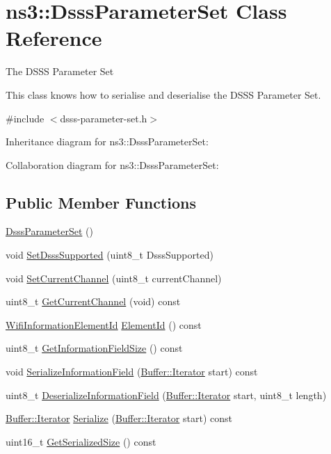 \hypertarget{classns3_1_1DsssParameterSet}{}\section{ns3\+:\+:Dsss\+Parameter\+Set Class Reference}
\label{classns3_1_1DsssParameterSet}


The D\+S\+SS Parameter Set

This class knows how to serialise and deserialise the D\+S\+SS Parameter Set.  




{\ttfamily \#include $<$dsss-\/parameter-\/set.\+h$>$}



Inheritance diagram for ns3\+:\+:Dsss\+Parameter\+Set\+:


Collaboration diagram for ns3\+:\+:Dsss\+Parameter\+Set\+:
\subsection*{Public Member Functions}
\begin{DoxyCompactItemize}
\item 
\hyperlink{classns3_1_1DsssParameterSet_a5b6ac7920637037ab3df38de9e98a553}{Dsss\+Parameter\+Set} ()
\item 
void \hyperlink{classns3_1_1DsssParameterSet_aface43655b0b568581d507b04dace538}{Set\+Dsss\+Supported} (uint8\+\_\+t Dsss\+Supported)
\item 
void \hyperlink{classns3_1_1DsssParameterSet_a52e56c7e20f9a889197920060d3b7a01}{Set\+Current\+Channel} (uint8\+\_\+t current\+Channel)
\item 
uint8\+\_\+t \hyperlink{classns3_1_1DsssParameterSet_a6e2de41db49669c844cfc7d9c42a90e9}{Get\+Current\+Channel} (void) const 
\item 
\hyperlink{namespacens3_aeb185e0c8a60816016bca079f1420478}{Wifi\+Information\+Element\+Id} \hyperlink{classns3_1_1DsssParameterSet_a5bf0573c9db53e28237a76c3a572299a}{Element\+Id} () const 
\item 
uint8\+\_\+t \hyperlink{classns3_1_1DsssParameterSet_a77ace7bf4d57619aabef04b6ebd0b14b}{Get\+Information\+Field\+Size} () const 
\item 
void \hyperlink{classns3_1_1DsssParameterSet_a885d1786dd164581bc1def2ca535e53f}{Serialize\+Information\+Field} (\hyperlink{classns3_1_1Buffer_1_1Iterator}{Buffer\+::\+Iterator} start) const 
\item 
uint8\+\_\+t \hyperlink{classns3_1_1DsssParameterSet_a9df98883c3a7e97de19ea1697231cd47}{Deserialize\+Information\+Field} (\hyperlink{classns3_1_1Buffer_1_1Iterator}{Buffer\+::\+Iterator} start, uint8\+\_\+t length)
\item 
\hyperlink{classns3_1_1Buffer_1_1Iterator}{Buffer\+::\+Iterator} \hyperlink{classns3_1_1DsssParameterSet_a5720c8b974f0c5080247330056d17201}{Serialize} (\hyperlink{classns3_1_1Buffer_1_1Iterator}{Buffer\+::\+Iterator} start) const 
\item 
uint16\+\_\+t \hyperlink{classns3_1_1DsssParameterSet_a0934f58362ca73cc1b9e3180015255b7}{Get\+Serialized\+Size} () const 
\end{DoxyCompactItemize}
